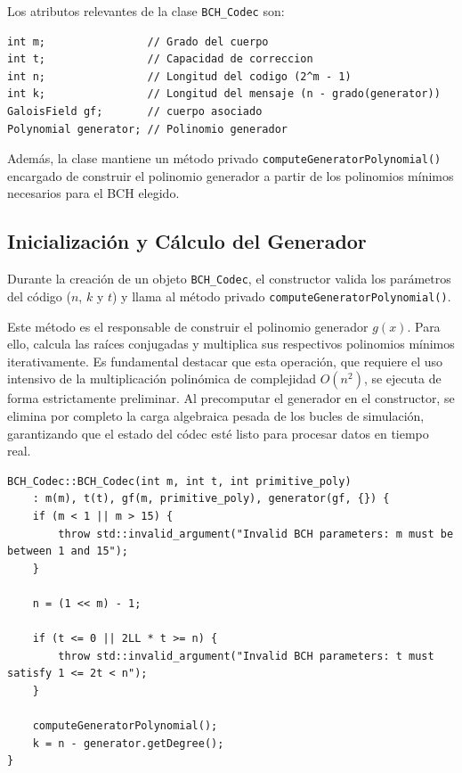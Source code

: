 Los atributos relevantes de la clase \texttt{BCH\_Codec} son:

\begin{lstlisting}[style=CodigoCPP, caption={Atributos principales de la clase \texttt{BCH\_Codec}, definiendo la geometría del código $(n, k, t)$ y su cuerpo de Galois asociado.}, label={lst:bch_atributos}]
int m;                // Grado del cuerpo
int t;                // Capacidad de correccion
int n;                // Longitud del codigo (2^m - 1)
int k;                // Longitud del mensaje (n - grado(generator))
GaloisField gf;       // cuerpo asociado
Polynomial generator; // Polinomio generador
\end{lstlisting}

Además, la clase mantiene un método privado \texttt{computeGeneratorPolynomial()} encargado de construir el polinomio generador a partir de los polinomios mínimos necesarios para el BCH elegido.

\subsection{Inicialización y Cálculo del Generador}

Durante la creación de un objeto \texttt{BCH\_Codec}, el constructor valida los parámetros del código ($n$, $k$ y $t$) y llama al método privado \texttt{computeGeneratorPolynomial()}.

Este método es el responsable de construir el polinomio generador $g(x)$. Para ello, calcula las raíces conjugadas y multiplica sus respectivos polinomios mínimos iterativamente. Es fundamental destacar que esta operación, que requiere el uso intensivo de la multiplicación polinómica de complejidad $O(n^2)$, se ejecuta de forma estrictamente preliminar. Al precomputar el generador en el constructor, se elimina por completo la carga algebraica pesada de los bucles de simulación, garantizando que el estado del códec esté listo para procesar datos en tiempo real.

\begin{lstlisting}[style=CodigoCPP, caption={Constructor de \texttt{BCH\_Codec} encargado de validar los parámetros de entrada y establecer las bases del cuerpo finito.}, label={lst:bch_constructor}]
BCH_Codec::BCH_Codec(int m, int t, int primitive_poly)
    : m(m), t(t), gf(m, primitive_poly), generator(gf, {}) {
    if (m < 1 || m > 15) {
        throw std::invalid_argument("Invalid BCH parameters: m must be between 1 and 15");
    }

    n = (1 << m) - 1;

    if (t <= 0 || 2LL * t >= n) {
        throw std::invalid_argument("Invalid BCH parameters: t must satisfy 1 <= 2t < n");
    }

    computeGeneratorPolynomial();
    k = n - generator.getDegree();
}
\end{lstlisting}

